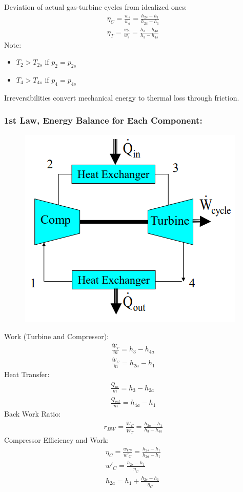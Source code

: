 \documentclass[class=report, crop=false, 12pt,a4paper]{standalone}
\numberwithin{equation}{section}
\begin{document}
Deviation of actual gas-turbine cycles from idealized ones:
\begin{gather}
  \eta_C = \frac{w_s}{w_a} = \frac{h_{2s}-h_1}{h_{2a}-h_1} \\[5pt]
  \eta_T = \frac{w_a}{w_s} = \frac{h_3-h_{4a}}{h_3-h_{4s}}
\end{gather}
Note:
\begin{itemize}[noitemsep]
  \item $T_2 > T_{2s}$ if $p_2 = p_{2s}$
  \item $T_4 > T_{4s}$ if $p_4 = p_{4s}$
\end{itemize}
Irreversibilities convert mechanical energy to thermal loss through friction.
\subsubsection{1st Law, Energy Balance for Each Component:}
\begin{figure}[H]
  \centering
  \includegraphics[width = 0.55 \textwidth]{../img/diagram155.png}
  \caption{}
\end{figure}
Work (Turbine and Compressor):
\begin{gather}
  \frac{\dot{W}_T}{\dot{m}} = h_3-h_{4a} \\[5pt]
  \frac{\dot{W}_C}{\dot{m}} = h_{2a}-h_1
\end{gather}
Heat Transfer:
\begin{gather}
  \frac{\dot{Q}_{in}}{\dot{m}} = h_3-h_{2a} \\[5pt]
  \frac{\dot{Q}_{out}}{\dot{m}} = h_{4a}-h_1
\end{gather}
Back Work Ratio:
\begin{gather}
  r_{BW} = \frac{\dot{W}_C}{\dot{W}_T} = \frac{h_{2a}-h_1}{h_3-h_{4a}}
\end{gather}
Compressor Efficiency and Work:
\begin{gather}
  \eta_C = \frac{w_{CS}}{w'_C} = \frac{h_{2s}-h_1}{h_{2a}-h_1} \\[5pt]
  w'_C = \frac{h_{2s}-h_1}{\eta_C} \\[5pt]
  h_{2a} = h_1 + \frac{h_{2s}-h_1}{\eta_C}
\end{gather}
\end{document}
